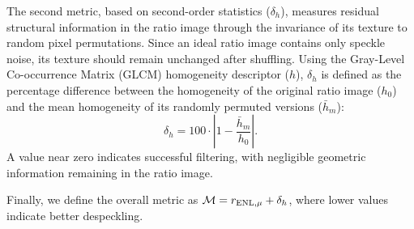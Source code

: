     The second metric, based on second-order statistics ($\delta_h$), measures residual structural information in the ratio image through the invariance of its texture to random pixel permutations. Since an ideal ratio image contains only speckle noise, its texture should remain unchanged after shuffling. Using the Gray-Level Co-occurrence Matrix (GLCM) homogeneity descriptor ($h$), $\delta_h$ is defined as the percentage difference between the homogeneity of the original ratio image ($h_0$) and the mean homogeneity of its randomly permuted versions ($\bar{h}_m$):
    \begin{equation}
    \delta_h = 100 \cdot \left| 1 - \frac{\bar{h}_m}{h_0} \right|.
    \end{equation}
    A value near zero indicates successful filtering, with negligible geometric information remaining in the ratio image.

    Finally, we define the overall metric as $\mathcal{M} = r_{\textnormal{ENL},\mu} + \delta_h$, where lower values indicate better despeckling.
